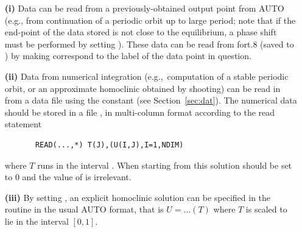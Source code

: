 \documentclass[12pt]{report}
\begin{document}
\begin{itemize}

\item[{\bf(i)}]
Data can be read from a previously-obtained output point from {\cal AUTO}
 (e.g., from continuation of a periodic orbit up to large period;
note that if the end-point of the data stored is not close to the
equilibrium, a phase shift must be performed by setting
). These data can be read from fort.8 (saved to ) by making  correspond to the label of the data
point in question.

\item[{\bf(ii)}]
Data from numerical integration (e.g.,\ computation of a stable
periodic orbit, or an approximate homoclinic obtained by shooting)  
can be read in from a data file using the \AUTO constant 
(see Section~\ref{sec:dat}). 
The  numerical data should be stored in
a file  , in multi-column format according to the read statement
\begin{verbatim}
       READ(...,*) T(J),(U(I,J),I=1,NDIM)
\end{verbatim}
where $T$ runs in the interval \parf{[0,1]}.
When starting from this solution  should be set to 0 and 
the value of  is irrelevant.

\item[{\bf(iii)}]
By setting ,  
an explicit homoclinic solution can be specified in the routine  
in the usual {\cal AUTO} format, that is 
$U=...(T)$ where $T$ is scaled to lie in the
interval $[0,1]$. 


\end{itemize}
\end{document}
